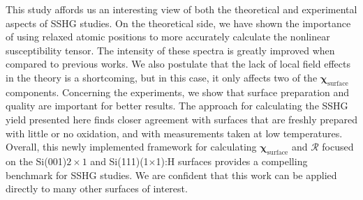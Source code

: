 This study affords us an interesting view of both the theoretical and
experimental aspects of SSHG studies. On the theoretical side, we have shown the
importance of using relaxed atomic positions to more accurately calculate the
nonlinear susceptibility tensor. The intensity of these spectra is greatly
improved when compared to previous works.\cite{mejiaPRB02} We also postulate
that the lack of local field effects in the theory is a shortcoming, but in this
case, it only affects two of the
$\boldsymbol{\chi}_{\mathrm{surface}}$ components.
Concerning the experiments, we show that surface preparation and quality are
important for better results. The approach for calculating the SSHG yield
presented here finds closer agreement with surfaces that are freshly prepared
with little or no oxidation, and with measurements taken at low temperatures.
Overall, this newly implemented framework for calculating
$\boldsymbol{\chi}_{\mathrm{surface}}$ and $\mathcal{R}$
focused on the Si(001)$2\times 1$ and  Si(111)(1$\times$1):H surfaces provides a
compelling benchmark for SSHG studies. We are confident that this work can be
applied directly to many other surfaces of interest.

\stopcontents[chapters]
